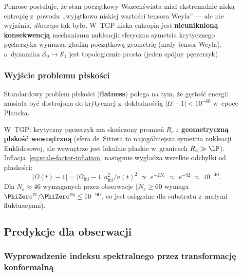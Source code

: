 \begin{remark}
Penrose postuluje, \.ze stan pocz\k{a}tkowy Wszech\'swiata
mia\l{} ekstremalnie nisk\k{a} entropi\k{e} z~powodu
,,wyj\k{a}tkowo niskiej warto\'sci tensora Weyla'' ---
ale nie wyja\'snia, \emph{dlaczego} tak by\l{}o. W~TGP
niska entropia jest \textbf{nieuniknion\k{a} konsekwencj\k{a}}
mechanizmu nukleacji: sferyczna symetria krytycznego
p\k{e}cherzyka wymusza g\l{}adk\k{a} pocz\k{a}tkow\k{a}
geometri\k{e} (ma\l{}y tensor Weyla), a~dynamika
$\mathcal{S}_0 \to \mathcal{S}_1$ jest topologicznie
prosta (jeden sp\'ojny p\k{e}czerzyk).
\end{remark}

\subsubsection{Wyj\'scie problemu p\l{}sko\'sci}

Standardowy problem p\l{}sko\'sci (\textbf{flatness}) polega na tym,
\.ze g\k{e}sto\'s\'c energii musia\l{}a by\'c dostrojona do kr\'ytycznej
z~dokładno\'sci\k{a} $|\Omega - 1| < 10^{-60}$ w~epoce Plancka.

W~TGP: krytyczny p\k{e}czerzyk ma sko\'nczony promie\'n $R_c$
i~\textbf{geometryczn\k{a} p\l{}sko\'s\'c wewn\k{e}trzn\k{a}}
(sfera de~Sittera to najog\'olniejsza symetria nukleacji
Euklidesowej, ale wewn\k{e}trze jest lokalnie p\l{}askie
w~granicach $R_c \gg \lP$). Inflacja~\eqref{eq:scale-factor-inflation}
nast\k{e}pnie wygładza wszelkie odchyłki od płaskości:
\begin{equation}\label{eq:flatness-resolution}
    |\Omega(t) - 1| = |\Omega_\mathrm{ini} - 1|\,a_\mathrm{ini}^2/a(t)^2
    \;\propto\; e^{-2N_e} \;\approx\; e^{-92} \;\approx\; 10^{-40}.
\end{equation}
Dla $N_e \approx 46$ wymaganych przez obserwacje ($N_e \geq 60$
wymaga $\PhiZero^{\mathrm{cr}}/\PhiZero^{\mathrm{eq}} \leq 10^{-90}$,
co jest osiągalne dla substratu z~małymi fluktuacjami).

\subsection{Predykcje dla obserwacji}%
\label{app:G-predykcje}

\subsubsection{Wyprowadzenie indeksu spektralnego przez transformacj\k{e}
konformaln\k{a}}
\label{app:G-starobinsky}

